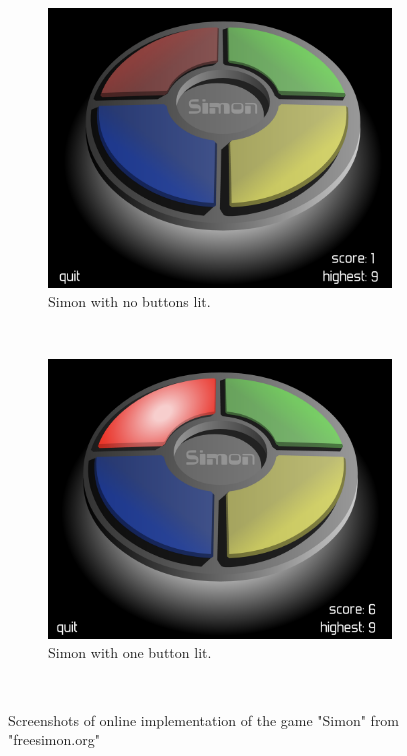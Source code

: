 \documentclass{l4proj}
\begin{document}


\begin{figure}[h!] %
  \centering

  \begin{subfigure}[b]{0.4\textwidth}
    \includegraphics[width=\textwidth]{dissertation/images/simon_before.png}
    \caption{Simon with no buttons lit.}
    \label{fig:simon_no_lights}
  \end{subfigure}
  ~ 
  \begin{subfigure}[b]{0.4\textwidth}
    \includegraphics[width=\textwidth]{dissertation/images/simon_during.png}
    \caption{Simon with one button lit.}
    \label{fig:simon_lit}
  \end{subfigure}
  ~  
  \caption{Screenshots of online implementation of the game "Simon" from "freesimon.org"}
  \label{fig:simon}  
\end{figure}
\end{document}
